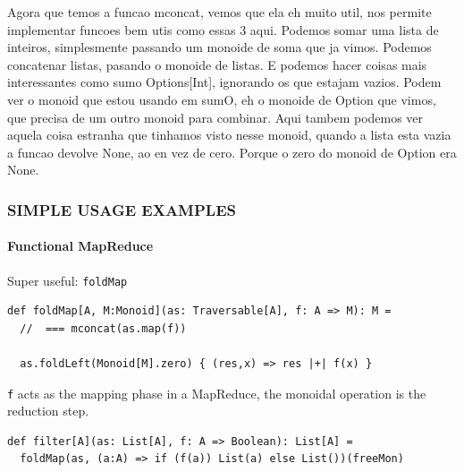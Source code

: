 \documentclass{beamer}
\begin{document}
\begin{frame}[fragile]
{    Agora que temos a funcao mconcat, vemos que ela eh muito util, nos permite
    implementar funcoes bem utis como essas 3 aqui. Podemos somar uma lista de
    inteiros, simplesmente passando um monoide de soma que ja vimos. Podemos
    concatenar listas, pasando o monoide de listas. E podemos hacer coisas mais
    interessantes como sumo Options[Int], ignorando os que estajam vazios.
    Podem ver o monoid que estou usando em sumO, eh o monoide de Option
    que vimos, que precisa de um outro monoid para combinar. Aqui tambem podemos
    ver aquela coisa estranha que tinhamos visto nesse monoid, quando a lista
    esta vazia a funcao devolve None, ao en vez de cero. Porque o zero do monoid
    de Option era None.
  }

\end{frame}

\begin{frame}[fragile] \frametitle{SIMPLE USAGE EXAMPLES}
  \framesubtitle{Functional MapReduce}
  \begin{block}{Super useful: \texttt{foldMap}}
  \begin{lstlisting}
def foldMap[A, M:Monoid](as: Traversable[A], f: A => M): M =
  //  === mconcat(as.map(f))

  as.foldLeft(Monoid[M].zero) { (res,x) => res |+| f(x) }
  \end{lstlisting}
  \end{block}

  \texttt{f} acts as the mapping phase in a MapReduce, the monoidal
  operation is the reduction step.

  \begin{block}{}
  \begin{lstlisting}
def filter[A](as: List[A], f: A => Boolean): List[A] =
  foldMap(as, (a:A) => if (f(a)) List(a) else List())(freeMon)
  \end{lstlisting}
  \end{block}

\end{frame}
\end{document}
